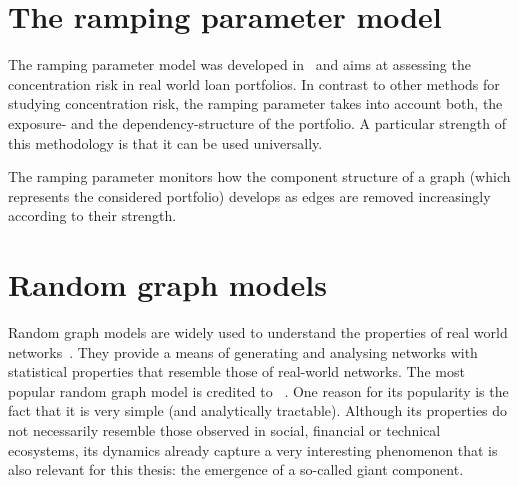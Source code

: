 \documentclass[12pt,beltcrest]{ociamthesis} %
\begin{document}

\section{The ramping parameter model} %
\label{sec:ramping_parameter}

The ramping parameter model was developed in~\cite{Sindel:2009vd} and aims at assessing the concentration risk in real world loan portfolios. 
In contrast to other methods for studying concentration risk, the ramping parameter takes into account both, the exposure- and the dependency-structure of the portfolio.
A particular strength of this methodology is that it can be used universally.

The ramping parameter monitors how the component structure of a graph (which represents the considered portfolio) develops as edges are removed increasingly according to their strength.





\section{Random graph models} %
\label{sec:random_graph_models}

Random graph models are widely used to understand the properties of real world networks~\cite{newman2002random}.
They provide a means of generating and analysing networks with statistical properties that resemble those of real-world networks.
The most popular random graph model is credited to %
~\cite{erdos1959random}.
One reason for its popularity is the fact that it is very simple (and analytically tractable).
Although its properties do not necessarily resemble those observed in social, financial or technical ecosystems, its dynamics already capture a very interesting phenomenon that is also relevant for this thesis: the emergence of a so-called giant component.
\end{document}
